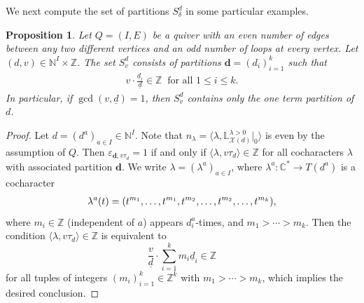 \documentclass [11pt,oneside,a4paper,mathscr]{amsart}
\newtheorem{prop}[thm]{Proposition}
\theoremstyle{definition}
\renewcommand{\leq}{\leqslant}
\newcommand{\X}{\mathscr{X}}
\newcommand{\dd}{\underline{d}}
\begin{document}
We next compute the set of partitions $S_{\delta}^d$ in some particular examples. 

\begin{prop}\label{computationsetsdv}
    Let $Q=(I,E)$ be a quiver with an even number of edges between 
    any two different vertices and an odd number of loops at every vertex. 
    Let $(d,v)\in \mathbb{N}^I\times\mathbb{Z}$. 
    The set $S^d_v$ consists of partitions $\mathbf{d}=(d_i)_{i=1}^k$ such that
    \begin{align*}
        v \cdot \frac{\dd_i}{\dd} \in \mathbb{Z} \ \mbox{ for all } 1\leq i\leq k. 
    \end{align*}
    In particular, if $\gcd(v,\dd)=1$, then $S^d_v$ contains only the one term partition of $d$.
\end{prop}

\begin{proof}
Let $d=(d^a)_{a\in I}\in \mathbb{N}^I$.
    Note that $n_\lambda=\langle \lambda, \mathbb{L}^{\lambda>0}_{\X(d)}|_0\rangle$ is even by the assumption of $Q$. Then $\varepsilon_{\mathbf{d},v\tau_d}=1$ if and only if $\langle \lambda, v\tau_d\rangle\in\mathbb{Z}$ for all cocharacters $\lambda$ with associated partition $\mathbf{d}$.
        We write $\lambda=(\lambda^a)_{a\in I}$, where $\lambda^a\colon\mathbb{C}^*\to T(d^a)$ is a cocharacter
\begin{align}\notag
    \lambda^{a}(t)=(t^{m_1}, \ldots, t^{m_1}, t^{m_2}, \ldots, t^{m_2}, \ldots, t^{m_k}),
\end{align}
where $m_i \in \mathbb{Z}$ (independent of $a$) appears $d^a_i$-times, and 
$m_1>\cdots>m_k$. 
Then the condition $\langle \lambda, v \tau_{d} \rangle \in \mathbb{Z}$
is equivalent to 
\[\frac{v}{\dd} \cdot \sum_{i=1}^k m_i \dd_i \in \mathbb{Z}\] for all tuples of integers $(m_i)_{i=1}^k\in\mathbb{Z}^k$
with $m_1>\cdots>m_k$, 
which implies the desired conclusion.
\end{proof}
\end{document}
